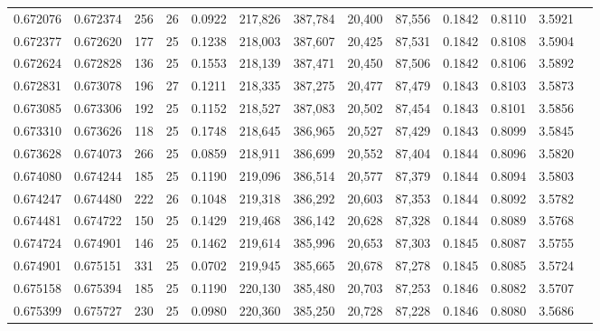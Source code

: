 \begin{tabular}{rrrrrrrrrrrrr}
0.672076 & 0.672374 &   256 &  26 &                                     0.0922 & 217,826 & 387,784 &  20,400 &  87,556 & 0.1842 & 0.8110 & 3.5921 \\
0.672377 & 0.672620 &   177 &  25 &                                     0.1238 & 218,003 & 387,607 &  20,425 &  87,531 & 0.1842 & 0.8108 & 3.5904 \\
0.672624 & 0.672828 &   136 &  25 &                                     0.1553 & 218,139 & 387,471 &  20,450 &  87,506 & 0.1842 & 0.8106 & 3.5892 \\
0.672831 & 0.673078 &   196 &  27 &                                     0.1211 & 218,335 & 387,275 &  20,477 &  87,479 & 0.1843 & 0.8103 & 3.5873 \\
0.673085 & 0.673306 &   192 &  25 &                                     0.1152 & 218,527 & 387,083 &  20,502 &  87,454 & 0.1843 & 0.8101 & 3.5856 \\
0.673310 & 0.673626 &   118 &  25 &                                     0.1748 & 218,645 & 386,965 &  20,527 &  87,429 & 0.1843 & 0.8099 & 3.5845 \\
0.673628 & 0.674073 &   266 &  25 &                                     0.0859 & 218,911 & 386,699 &  20,552 &  87,404 & 0.1844 & 0.8096 & 3.5820 \\
0.674080 & 0.674244 &   185 &  25 &                                     0.1190 & 219,096 & 386,514 &  20,577 &  87,379 & 0.1844 & 0.8094 & 3.5803 \\
0.674247 & 0.674480 &   222 &  26 &                                     0.1048 & 219,318 & 386,292 &  20,603 &  87,353 & 0.1844 & 0.8092 & 3.5782 \\
0.674481 & 0.674722 &   150 &  25 &                                     0.1429 & 219,468 & 386,142 &  20,628 &  87,328 & 0.1844 & 0.8089 & 3.5768 \\
0.674724 & 0.674901 &   146 &  25 &                                     0.1462 & 219,614 & 385,996 &  20,653 &  87,303 & 0.1845 & 0.8087 & 3.5755 \\
0.674901 & 0.675151 &   331 &  25 &                                     0.0702 & 219,945 & 385,665 &  20,678 &  87,278 & 0.1845 & 0.8085 & 3.5724 \\
0.675158 & 0.675394 &   185 &  25 &                                     0.1190 & 220,130 & 385,480 &  20,703 &  87,253 & 0.1846 & 0.8082 & 3.5707 \\
0.675399 & 0.675727 &   230 &  25 &                                     0.0980 & 220,360 & 385,250 &  20,728 &  87,228 & 0.1846 & 0.8080 & 3.5686 \\

\end{tabular}
